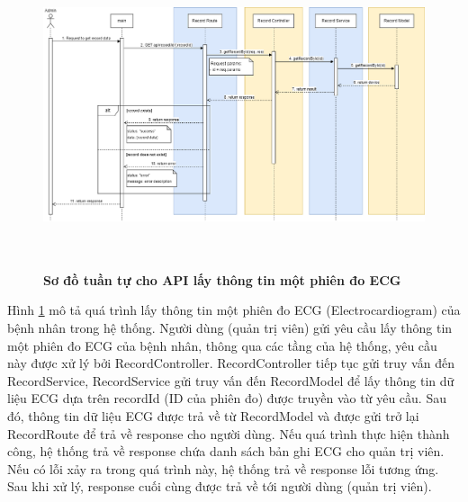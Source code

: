 \begin{figure}[H]
  \centering
  \includegraphics[width=16cm,height=9cm]{Images/sequence_api/getRecordById.png}
  \caption[Sơ đồ tuần tự cho API lấy thông tin một phiên đo ECG ]{\bfseries \fontsize{12pt}{0pt}
  \selectfont Sơ đồ tuần tự cho API lấy thông tin một phiên đo ECG }
  \label{getRecordById} %
\end{figure}
Hình \ref{getRecordById} mô tả quá trình lấy thông tin một phiên đo ECG (Electrocardiogram) của bệnh nhân trong hệ thống. Người dùng (quản trị viên) gửi yêu cầu lấy thông tin một phiên đo ECG của bệnh nhân, thông qua các tầng của hệ thống, 
yêu cầu này được xử lý bởi RecordController. RecordController tiếp tục gửi truy vấn đến RecordService, RecordService gửi truy vấn đến RecordModel để lấy thông tin dữ liệu ECG dựa trên recordId (ID của phiên đo) được truyền vào từ yêu cầu. 
Sau đó, thông tin dữ liệu ECG được trả về từ RecordModel và được gửi trở lại RecordRoute để trả về response cho người dùng. Nếu quá trình thực hiện thành công, hệ thống trả về response chứa danh sách bản ghi ECG cho quản trị viên. Nếu có lỗi xảy ra
 trong quá trình này, hệ thống trả về response lỗi tương ứng. Sau khi xử lý, response cuối cùng được trả về tới người dùng (quản trị viên).

